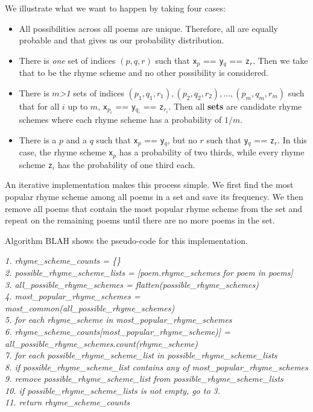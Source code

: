 We illustrate what we want to happen by taking four cases:
\begin{itemize}
\item{All possibilities across all poems are unique. Therefore, all are equally probable and that gives us our probability distribution.}
\item{There is \textit{one} set of indices $(p, q, r)$ such that \texttt{x$_p$} == \texttt{y$_q$} == \texttt{z$_r$}. Then we take that to be the rhyme scheme and no other possibility is considered.}
\item{There is $m$\textit{\textgreater 1} sets of indices $(p_1, q_1, r_1), (p_2, q_2, r_2), ..., (p_m, q_m, r_m)$ such that for all $i$ up to $m$, \texttt{x$_{p_i}$} == \texttt{y$_{q_i}$} == \texttt{z$_{r_i}$}. Then all \textbf{sets} are candidate rhyme schemes where each rhyme scheme has a probability of $1/m$.}
\item{There is a $p$ and a $q$ such that \texttt{x$_p$} == \texttt{y$_q$}, but no $r$ such that \texttt{y$_q$} == \texttt{z$_r$}. In this case, the rhyme scheme \texttt{x$_p$} has a probability of two thirds, while every rhyme scheme \texttt{z$_i$} has the probability of one third each.}
\end{itemize}

An iterative implementation makes this process simple. We first find the most popular rhyme scheme among all poems in a set and save its frequency. We then remove all poems that contain the most popular rhyme scheme from the set and repeat on the remaining poems until there are no more poems in the set. 

Algorithm BLAH shows the pseudo-code for this implementation.

\textit{
 1. rhyme\_scheme\_counts = \{\}\\
 2. possible\_rhyme\_scheme\_lists = [poem.rhyme\_schemes for poem in poems]\\
 3. all\_possible\_rhyme\_schemes = flatten(possible\_rhyme\_schemes)\\
 4. most\_popular\_rhyme\_schemes = most\_common(all\_possible\_rhyme\_schemes)\\
 5. for each rhyme\_scheme in most\_popular\_rhyme\_schemes\\
 6. 		rhyme\_scheme\_counts[most\_popular\_rhyme\_scheme)] = all\_possible\_rhyme\_schemes.count(rhyme\_scheme)\\
 7. for each possible\_rhyme\_scheme\_list in possible\_rhyme\_scheme\_lists\\
 8.		if possible\_rhyme\_scheme\_list contains any of  most\_popular\_rhyme\_schemes\\
 9.			remove possible\_rhyme\_scheme\_list from possible\_rhyme\_scheme\_lists\\
10. if possible\_rhyme\_scheme\_lists is not empty, go to 3.\\
11. return rhyme\_scheme\_counts\\
}

